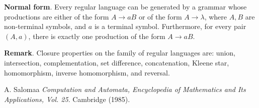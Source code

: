\documentclass[12pt]{article}
\begin{document}
\textbf{Normal form}.  Every regular language can be generated by a grammar whose productions are either of the form $A\to aB$ or of the form $A\to \lambda$, where $A,B$ are non-terminal symbols, and $a$ is a terminal symbol.  Furthermore, for every pair $(A,a)$, there is exactly one production of the form $A\to aB$.

\textbf{Remark}.  Closure properties on the family of regular languages are: union, intersection, complementation, set difference, concatenation, Kleene star, homomorphism, inverse homomorphism, and reversal.

\begin{thebibliography}{9}
 A. Salomaa {\em Computation and Automata, Encyclopedia of Mathematics and Its Applications, Vol. 25}. Cambridge (1985).
\end{thebibliography}
\end{document}
